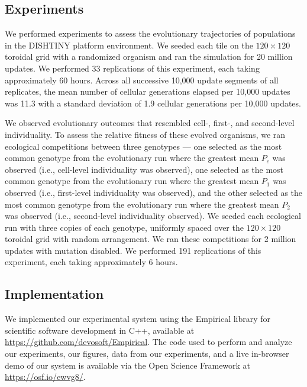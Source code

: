 \subsection{Experiments}

We performed experiments to assess the evolutionary trajectories of populations in the DISHTINY platform environment.
We seeded each tile on the $120 \times 120$ toroidal grid with a randomized organism and ran the simulation for 20 million updates.
We performed 33 replications of this experiment, each taking approximately 60 hours.
Across all successive 10,000 update segments of all replicates, the mean number of cellular generations elapsed per 10,000 updates was 11.3 with a standard deviation of 1.9 cellular generations per 10,000 updates.

We observed evolutionary outcomes that resembled cell-, first-, and second-level individuality.
To assess the relative fitness of these evolved organisms, we ran ecological competitions between three genotypes --- one selected as the most common genotype from the evolutionary run where the greatest mean $P_{c}$ was observed (i.e., cell-level individuality was observed), one selected as the most common genotype from the evolutionary run where the greatest mean $P_1$ was observed (i.e., first-level individuality was observed), and the other selected as the most common genotype from the evolutionary run where the greatest mean $P_2$ was observed (i.e., second-level individuality observed).
We seeded each ecological run with three copies of each genotype, uniformly spaced over the $120 \times 120$ toroidal grid with random arrangement.
We ran these competitions for 2 million updates with mutation disabled.
We performed 191 replications of this experiment, each taking approximately 6 hours.

\subsection{Implementation}

We implemented our experimental system using the Empirical library for scientific software development in C++, available at \url{https://github.com/devosoft/Empirical}.  The code used to perform and analyze our experiments, our figures, data from our experiments, and a live in-browser demo of our system is available via the Open Science Framework at \url{https://osf.io/ewvg8/}.
